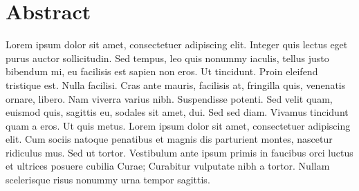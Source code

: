 \chapter*{Abstract}
Lorem ipsum dolor sit amet, consectetuer adipiscing elit. Integer quis lectus eget purus auctor sollicitudin. Sed tempus, leo quis nonummy iaculis, tellus justo bibendum mi, eu facilisis est sapien non eros. Ut tincidunt. Proin eleifend tristique est. Nulla facilisi. Cras ante mauris, facilisis at, fringilla quis, venenatis ornare, libero. Nam viverra varius nibh. Suspendisse potenti. Sed velit quam, euismod quis, sagittis eu, sodales sit amet, dui. Sed sed diam. Vivamus tincidunt quam a eros. Ut quis metus. Lorem ipsum dolor sit amet, consectetuer adipiscing elit. Cum sociis natoque penatibus et magnis dis parturient montes, nascetur ridiculus mus. Sed ut tortor. Vestibulum ante ipsum primis in faucibus orci luctus et ultrices posuere cubilia Curae; Curabitur vulputate nibh a tortor. Nullam scelerisque risus nonummy urna tempor sagittis.